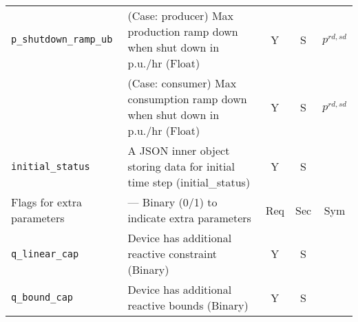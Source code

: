\documentclass{article}
\begin{document}
\begin{center}
\begin{tabular}{ l | l | c | c | c |}
  {\tt p\_shutdown\_ramp\_ub}& {(Case: producer) Max production ramp down when shut down in p.u./hr (Float)} & Y & S & $p^{rd,sd}$\\
                             & {(Case: consumer) Max consumption ramp down when shut down in p.u./hr (Float)} & Y & S & $p^{rd,sd}$\\
  \hline
  {\tt initial\_status} & A JSON inner object storing data for initial time step (initial\_status) & Y & S &  \\
  \hline
  Flags for extra parameters & --- Binary (0/1) to indicate extra parameters & Req & Sec & Sym\\
   \hline
  {\tt q\_linear\_cap}      & Device has additional reactive constraint (Binary) & Y & S & \\
  {\tt q\_bound\_cap}       & Device has additional reactive bounds (Binary) & Y & S & \\
  \hline
\end{tabular}
\end{center}
\end{document}
